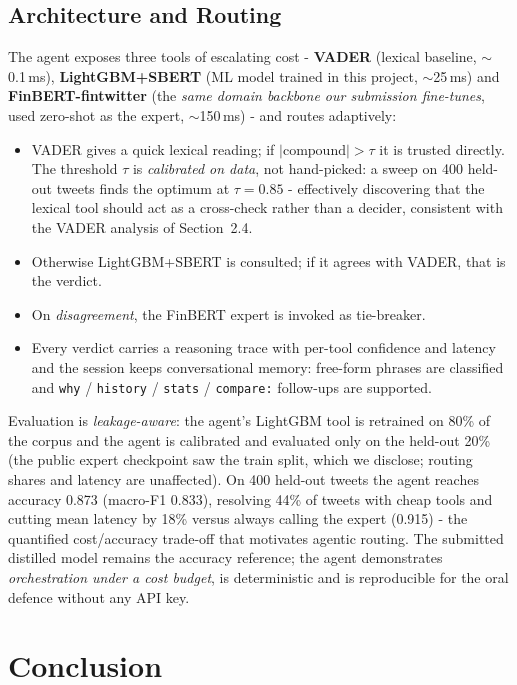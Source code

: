 \documentclass[11pt,a4paper]{article}
\newcommand{\tH}[1]{\textcolor{maincolor}{\textbf{#1}}}
\begin{document}
\subsection{Architecture and Routing}
The agent exposes three tools of escalating cost - \tH{VADER} (lexical baseline,
$\sim$0.1\,ms), \tH{LightGBM+SBERT} (ML model trained in this project, $\sim$25\,ms) and
\tH{FinBERT-fintwitter} (the \emph{same domain backbone our submission fine-tunes}, used
zero-shot as the expert, $\sim$150\,ms) - and routes adaptively:
\begin{itemize}
  \item VADER gives a quick lexical reading; if $|\text{compound}| > \tau$ it is trusted directly.
  The threshold $\tau$ is \emph{calibrated on data}, not hand-picked: a sweep on 400 held-out
  tweets finds the optimum at $\tau{=}0.85$ - effectively discovering that the lexical tool
  should act as a cross-check rather than a decider, consistent with the VADER analysis of
  Section~2.4.
  \item Otherwise LightGBM+SBERT is consulted; if it agrees with VADER, that is the verdict.
  \item On \emph{disagreement}, the FinBERT expert is invoked as tie-breaker.
  \item Every verdict carries a reasoning trace with per-tool confidence and latency and the
  session keeps conversational memory: free-form phrases are classified and \texttt{why} /
  \texttt{history} / \texttt{stats} / \texttt{compare:} follow-ups are supported.
\end{itemize}
Evaluation is \emph{leakage-aware}: the agent's LightGBM tool is retrained on 80\% of the corpus
and the agent is calibrated and evaluated only on the held-out 20\% (the public expert checkpoint
saw the train split, which we disclose; routing shares and latency are unaffected). On 400
held-out tweets the agent reaches accuracy 0.873 (macro-F1 0.833), resolving 44\% of tweets with
cheap tools and cutting mean latency by 18\% versus always calling the expert (0.915) - the
quantified cost/accuracy trade-off that motivates agentic routing. The submitted distilled model
remains the accuracy reference; the agent demonstrates \emph{orchestration under a cost budget},
is deterministic and is reproducible for the oral defence without any API key.


\section{Conclusion}
\end{document}
